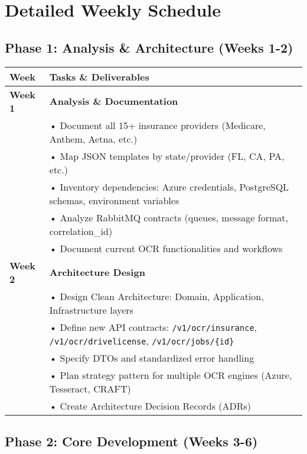 \documentclass[11pt,a4paper]{article}
\begin{document}
\section{Detailed Weekly Schedule}

\subsection{Phase 1: Analysis \& Architecture (Weeks 1-2)}

\begin{longtable}{|p{2cm}|p{12cm}|}
\hline
\rowcolor{phase1!30}
\textbf{Week} & \textbf{Tasks \& Deliverables} \\
\hline
\endhead

\textbf{Week 1} & 
\textbf{Analysis \& Documentation} \\
& • Document all 15+ insurance providers (Medicare, Anthem, Aetna, etc.) \\
& • Map JSON templates by state/provider (FL, CA, PA, etc.) \\
& • Inventory dependencies: Azure credentials, PostgreSQL schemas, environment variables \\
& • Analyze RabbitMQ contracts (queues, message format, correlation\_id) \\
& • Document current OCR functionalities and workflows \\
\hline

\textbf{Week 2} & 
\textbf{Architecture Design} \\
& • Design Clean Architecture: Domain, Application, Infrastructure layers \\
& • Define new API contracts: \texttt{/v1/ocr/insurance}, \texttt{/v1/ocr/drivelicense}, \texttt{/v1/ocr/jobs/\{id\}} \\
& • Specify DTOs and standardized error handling \\
& • Plan strategy pattern for multiple OCR engines (Azure, Tesseract, CRAFT) \\
& • Create Architecture Decision Records (ADRs) \\
\hline
\end{longtable}

\subsection{Phase 2: Core Development (Weeks 3-6)}
\end{document}
